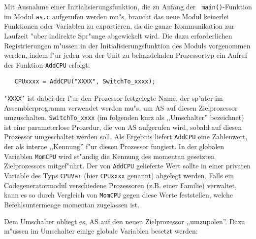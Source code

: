\documentclass[12pt,a4paper,twoside]{report}
\newcommand{\tty}[1]{{\tt #1}}
\newcommand{\asname}{AS}
\begin{document}
Mit Ausnahme einer Initialisierungsfunktion, die zu Anfang der {\tt
main()}-Funktion im Modul {\tt as.c} aufgerufen werden mu"s, braucht das
neue Modul keinerlei Funktionen oder Variablen zu exportieren, da die
ganze Kommunikation zur Laufzeit "uber indirekte Spr"unge abgewickelt
wird.  Die dazu erforderlichen Registrierungen m"ussen in der
Initialisierungsfunktion des Moduls vorgenommen werden, indem f"ur jeden
von der Unit zu behandelnden Prozessortyp
ein Aufruf der Funktion \tty{AddCPU} erfolgt:
\begin{verbatim}
   CPUxxxx = AddCPU("XXXX", SwitchTo_xxxx);
\end{verbatim}
\tty{'XXXX'} ist dabei der f"ur den Prozessor festgelegte Name, der sp"ater
im Assemblerprogramm verwendet werden mu"s, um \asname{} auf diesen Zielprozessor
umzuschalten.  \tty{SwitchTo\_xxxx} (im folgenden kurz als ,,Umschalter''
bezeichnet) ist eine parameterlose Prozedur, die von \asname{} aufgerufen wird,
sobald auf diesen Prozessor umgeschaltet werden soll.  Als Ergebnis liefert
\tty{AddCPU} eine Zahlenwert, der als interne ,,Kennung'' f"ur diesen Prozessor
fungiert.  In der globalen Variablen \tty{MomCPU} wird st"andig die Kennung
des momentan gesetzten Zielprozessors mitgef"uhrt.  Der von \tty{AddCPU}
gelieferte Wert sollte in einer privaten Variable des Typs \tty{CPUVar} (hier
\tty{CPUxxxx} genannt) abgelegt werden.  Falls ein Codegeneratormodul
verschiedene Prozessoren (z.B. einer Familie) verwaltet, kann es so
durch Vergleich von \tty{MomCPU} gegen diese Werte feststellen, welche
Befehlsuntermenge momentan zugelassen ist.
\par
Dem Umschalter obliegt es, \asname{} auf den neuen Zielprozessor ,,umzupolen''.
Dazu m"ussen im Umschalter einige globale Variablen besetzt werden:
\end{document}
